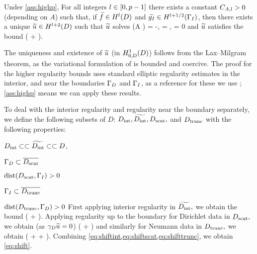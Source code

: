 \label{thm:shift}
Under \cref{ass:highp}, For all integers $l \in \mleft[0,p-1\mright]$ there exists a constant $C_{A,l}>0$ (depending on $A$) such that, if $\ftilde \in \HlD$ and $\gItilde \in \HlphGI$, then there exists a unique $\utilde \in \HlptD$ such that $\widetilde{u}$ solves
\beqs
\grad \cdot \mleft(A \grad \utilde\mright) = -\ftilde,
\eeqs
\beqs
\dn \utilde = \gItilde, \tand
\eeqs
\beqs
\trD \utilde = 0
\eeqs
and $\widetilde{u}$ satisfies the bound
\beq\label{eq:shift}
\NHlptD{\utilde} \leq \CAl \mleft(\NHlD{\ftilde} + \NHlphGI{\gItilde}\mright).
\eeq
\enth

The uniqueness and existence of $\widetilde{u}$ (in $\HozDD$) follows from the Lax--Milgram theorem, as the variational formulation of is bounded and coercive. The proof for the higher regularity bounds uses standard elliptic regularity estimates in the interior, and near the boundaries $\Gamma_{D}$ and $\Gamma_{I}$, as a reference for these we use \cite[pp. 137-138]{Mc:00}; \cref{ass:highp} means we can apply these results.

To deal with the interior regularity and regularity near the boundary separately, we define the following subsets of $D$: $D_{\mathrm{int}},\widetilde{D_{\mathrm{int}}},D_{\mathrm{scat}},$ and $D_{\mathrm{trunc}}$ with the following properties:
\bit
\item $D_{\mathrm{int}} \subset\subset \widetilde{D_{\mathrm{int}}} \subset\subset D$,
\item $\Gamma_{D} \subset \overline{D_{\mathrm{scat}}}$
\item $\operatorname{dist}(D_{\mathrm{scat}},\Gamma_{I}) > 0 $
  \item $\Gamma_{I} \subset \overline{D_{\mathrm{trunc}}}$
\item $\operatorname{dist}(D_{\mathrm{trunc}},\Gamma_{D}) > 0 $
    \eit
    First applying interior regularity \cite[Theorem 4.16]{Mc:00} in $\widetilde{D_{\mathrm{int}}},$ we obtain the bound
    \beq\label{eq:shiftint}
\NHlptDint{\utilde} \leq \CintAl \mleft(\NHoDinttilde{\utilde} + \NHlDinttilde{\ftilde}\mright).
\eeq
Applying regularity up to the boundary for Dirichlet data \cite[Theorem 4.18 (i)]{Mc:00} in $D_{\mathrm{scat}},$ we obtain (as $\gamma_{D} \widetilde{u} = 0$)
\beq\label{eq:shiftscat}
\NHlptDscat{\utilde} \leq \CscatAl \mleft(\NHoD{\utilde} + \NHlD{\ftilde}\mright)
\eeq
and similarly for Neumann data \cite[Theorem 4.18 (ii)]{Mc:00} in $D_{\mathrm{trunc}},$ we obtain
\beq\label{eq:shifttrunc}
\NHlptDtrunc{\utilde} \leq \CtruncAl \mleft(\NHoD{\utilde} + \NHlphGI{\dn \utilde} + \NHlD{\ftilde}\mright).
\eeq
Combining \cref{eq:shiftint,eq:shiftscat,eq:shifttrunc}, we obtain \cref{eq:shift}.
\epf

